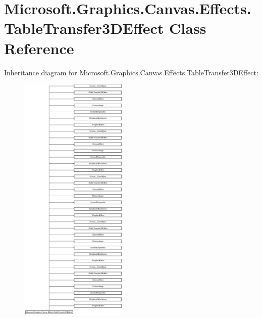 \hypertarget{class_microsoft_1_1_graphics_1_1_canvas_1_1_effects_1_1_table_transfer3_d_effect}{}\section{Microsoft.\+Graphics.\+Canvas.\+Effects.\+Table\+Transfer3\+D\+Effect Class Reference}
\label{class_microsoft_1_1_graphics_1_1_canvas_1_1_effects_1_1_table_transfer3_d_effect}
Inheritance diagram for Microsoft.\+Graphics.\+Canvas.\+Effects.\+Table\+Transfer3\+D\+Effect\+:\begin{figure}[H]
\begin{center}
\leavevmode
\includegraphics[height=12.000000cm]{class_microsoft_1_1_graphics_1_1_canvas_1_1_effects_1_1_table_transfer3_d_effect}
\end{center}
\end{figure}
